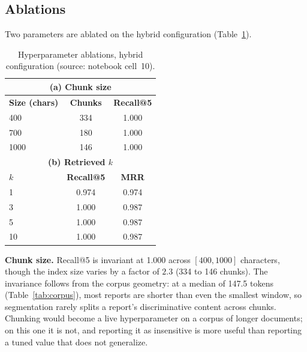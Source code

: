 \documentclass[12pt, a4paper]{article}
\begin{document}
\subsection{Ablations}
\label{sec:ablation}

Two parameters are ablated on the hybrid configuration (Table~\ref{tab:ablation}).

\begin{table}[H]
\centering
\caption{Hyperparameter ablations, hybrid configuration (source: notebook cell~10).}
\begin{tabular}{lcc}
\toprule
\multicolumn{3}{c}{\textbf{(a) Chunk size}} \\
\midrule
\textbf{Size (chars)} & \textbf{Chunks} & \textbf{Recall@5} \\
\midrule
400 & 334 & 1.000 \\
700 & 180 & 1.000 \\
1000 & 146 & 1.000 \\
\midrule
\multicolumn{3}{c}{\textbf{(b) Retrieved $k$}} \\
\midrule
\textbf{$k$} & \textbf{Recall@5} & \textbf{MRR} \\
\midrule
1 & 0.974 & 0.974 \\
3 & 1.000 & 0.987 \\
5 & 1.000 & 0.987 \\
10 & 1.000 & 0.987 \\
\bottomrule
\end{tabular}
\label{tab:ablation}
\end{table}

\textbf{Chunk size.} Recall@5 is invariant at 1.000 across $[400, 1000]$ characters, though the index size varies by a factor of $2.3$ (334 to 146 chunks). The invariance follows from the corpus geometry: at a median of 147.5 tokens (Table~\ref{tab:corpus}), most reports are shorter than even the smallest window, so segmentation rarely splits a report's discriminative content across chunks. Chunking would become a live hyperparameter on a corpus of longer documents; on this one it is not, and reporting it as insensitive is more useful than reporting a tuned value that does not generalize.
\end{document}

